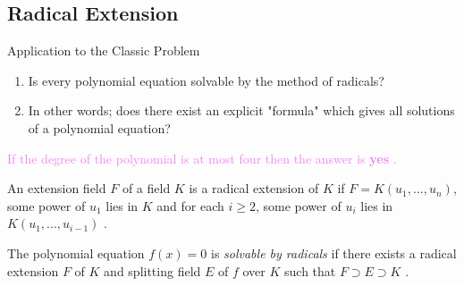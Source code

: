 \documentclass{beamer}
\begin{document}
\subsection{Radical Extension}
\begin{frame}{Application to the Classic Problem}
  \begin{tcolorbox}[colback=white, colframe=red, boxsep=1mm, title={\bfseries \color{white} Question:}]

    \begin{enumerate}
    \item Is every polynomial equation solvable by the method of radicals?
    \item In other words; does there exist an explicit "formula" which gives all solutions of a polynomial equation?
    \end{enumerate}
  \end{tcolorbox}


\textcolor{violet}{If the degree of the polynomial is at most four then the answer is \textbf{yes} \cite{hunger}.}
\vspace{7mm}
\begin{definition}
  An extension field \(F\) of a field \(K\) is a radical extension of \(K\) if \(F=K(u_1,...,u_n)\), some power of \(u_1\) lies in \(K\) and for each \(i \geq 2\), some power of \(u_i\) lies in \(K(u_1,...,u_{i-1})\) \cite{hunger}.
\end{definition}
\vspace{4mm}
\textcolor{green!50!black}{The polynomial equation \(f(x)=0\) is \textit{solvable by radicals} if there exists a radical extension} \(F\) of \(K\) and splitting field \(E\) of \(f\) over \(K\) such that \(F \supset E \supset K\) \cite{hunger}.
\end{frame}
\end{document}
